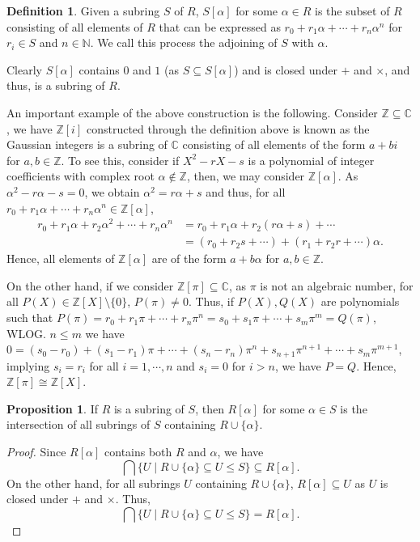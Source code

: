 \documentclass[]{article}
\theoremstyle{definition}
\theoremstyle{definition}
\newtheorem{definition}{Definition}[section]
\newtheorem{proposition}{Proposition}[section]
\begin{document}
\begin{definition}
  Given a subring \(S\) of \(R\), \(S[\alpha]\) for some \(\alpha \in R\) is the 
  subset of \(R\) consisting of all elements of \(R\) that can be expressed as 
  \(r_0 + r_1 \alpha + \cdots + r_n \alpha^n\) for \(r_i \in S\) and 
  \(n \in \mathbb{N}\). We call this process the adjoining of \(S\) with \(\alpha\).
\end{definition}

Clearly \(S[\alpha]\) contains \(0\) and \(1\) (as \(S \subseteq S[\alpha]\)) 
and is closed under \(+\) and \(\times\), and thus, is a subring of \(R\).

An important example of the above construction is the following. Consider 
\(\mathbb{Z} \subseteq \mathbb{C}\), we have \(\mathbb{Z}[i]\) constructed 
through the definition above is known as the Gaussian integers is a subring 
of \(\mathbb{C}\) consisting of all elements of the form \(a + bi\) for 
\(a, b \in \mathbb{Z}\). To see this, consider if \(X^2 - r X - s\) is a polynomial 
of integer coefficients with complex root \(\alpha \notin \mathbb{Z}\), then, 
we may consider \(\mathbb{Z}[\alpha]\). As \(\alpha^2 - r \alpha - s = 0\), 
we obtain \(\alpha^2 = r \alpha + s\) and thus, for all 
\(r_0 + r_1 \alpha + \cdots + r_n \alpha^n \in \mathbb{Z}[\alpha]\),
\[\begin{split}
  r_0 + r_1 \alpha + r_2 \alpha^2 + \cdots + r_n \alpha^n 
  & = r_0 + r_1 \alpha + r_2 (r \alpha + s) + \cdots \\
  & = (r_0 + r_2 s + \cdots) + (r_1 + r_2 r + \cdots) \alpha.
\end{split}\]
Hence, all elements of \(\mathbb{Z}[\alpha]\) are of the form \(a + b \alpha\) 
for \(a, b \in \mathbb{Z}\).

On the other hand, if we consider \(\mathbb{Z}[\pi] \subseteq \mathbb{C}\), 
as \(\pi\) is not an algebraic number, for all \(P(X) \in \mathbb{Z}[X] \setminus \{0\}\), 
\(P(\pi) \neq 0\). Thus, if \(P(X), Q(X)\) are polynomials such that
\(P(\pi) = r_0 + r_1 \pi + \cdots + r_n \pi^n = s_0 + s_1 \pi + \cdots + s_m \pi^m = Q(\pi)\), 
WLOG. \(n \le m\) we have \(0 = (s_0 - r_0) + (s_1 - r_1) \pi + \cdots + 
(s_n - r_n) \pi^n + s_{n + 1} \pi^{n + 1} + \cdots + s_m \pi^{m + 1}\), implying 
\(s_i = r_i\) for all \(i = 1, \cdots, n\) and \(s_i = 0\) for \(i > n\), we have 
\(P = Q\). Hence, \(\mathbb{Z}[\pi] \cong \mathbb{Z}[X]\).

\begin{proposition}
  If \(R\) is a subring of \(S\), then \(R[\alpha]\) for some \(\alpha \in S\) 
  is the intersection of all subrings of \(S\) containing \(R \cup \{\alpha\}\).
\end{proposition}
\begin{proof}
  Since \(R[\alpha]\) contains both \(R\) and \(\alpha\), we have 
  \[\bigcap \{U \mid R \cup \{\alpha\} \subseteq U \le S\} \subseteq R[\alpha].\]
  On the other hand, for all subrings \(U\) containing \(R \cup \{\alpha\}\), 
  \(R[\alpha] \subseteq U\) as \(U\) is closed under \(+\) and \(\times\). 
  Thus, 
  \[\bigcap \{U \mid R \cup \{\alpha\} \subseteq U \le S\} = R[\alpha].\]
\end{proof}
\end{document}

